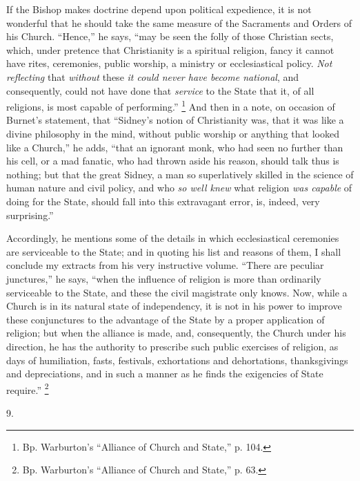 If the Bishop makes doctrine depend upon political expedience, it
is not wonderful that he should take the same measure of the
Sacraments and Orders of his Church. ``Hence,'' he says,
``may be seen the folly of those Christian sects, which, under
pretence that Christianity is a spiritual religion, fancy it cannot
have rites, ceremonies, public worship, a ministry or ecclesiastical
policy. \emph{Not reflecting} that \emph{without} these \emph{it could
never have become national}, and consequently, could not have done
that \emph{service} to the State that it, of all religions, is most capable
of performing.'' \footnote{Bp. Warburton's ``Alliance of Church and
State,'' p. 104.} And
then in a note, on occasion of Burnet's statement, that ``Sidney's
notion of Christianity was, that it was like a divine philosophy in
the mind, without public worship or anything that looked like a
Church,'' he adds, ``that an ignorant monk, who had seen no
further than his cell, or a mad fanatic, who had thrown aside his
reason, should talk thus is nothing; but that the great Sidney, a man
so superlatively skilled in the science of human nature and civil
policy, and who \emph{so well knew} what religion \emph{was capable}
of doing for the State, should fall into this extravagant error, is,
indeed, very surprising.''

Accordingly, he mentions some of the details in which
ecclesiastical ceremonies are serviceable to the State; and in quoting
his list and reasons of them, I shall conclude my extracts from his
very instructive volume. ``There are peculiar junctures,'' he
says, ``when the influence of religion is more than ordinarily
serviceable to the State, and these the civil magistrate only knows.
Now, while a Church is in its natural state of independency, it is not
in his power to improve these conjunctures to the advantage of the
State by a proper application of religion; but when the alliance is
made, and, consequently, the Church under his direction, he has the
authority to prescribe such public exercises of religion, as days of
humiliation, fasts, festivals, exhortations and dehortations,
thanksgivings and depreciations, and in such a manner as he finds the
exigencies of State require.'' \footnote{Bp. Warburton's ``Alliance of Church
and State,'' p. 63.}

9.

